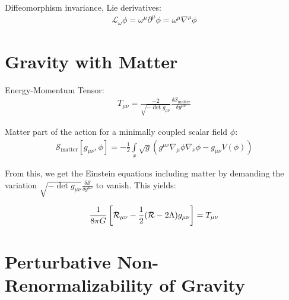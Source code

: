 Diffeomorphism invariance, Lie derivatives:
\begin{align}
	\mathcal{L}_{\omega}\phi = \omega^{\mu}\partial^{\mu}\phi = \omega^{\mu}\nabla^{\mu}\phi
\end{align}

\section{Gravity with Matter} 

Energy-Momentum Tensor:
\begin{align}
	T_{\mu\nu} = \frac{-2}{\sqrt{-\operatorname{det}g_{\mu\nu}}} \frac{\delta\mathcal{S}_{\text{matter}}}{\delta g^{\mu\nu}}
\end{align}

Matter part of the action for a minimally coupled scalar field $\phi$:
\begin{align}
	\mathcal{S}_{\text{matter}}[g_{\mu\nu}, \phi] = -\frac{1}{2} \int\limits_x \sqrt{g}\left( g^{\mu\nu}\nabla_{\mu}\phi\nabla_{\nu}\phi - g_{\mu\nu} V(\phi) \right)
\end{align}

From this, we get the Einstein equations including matter by demanding the variation $\sqrt{-\operatorname{det}g_{\mu\nu}}\frac{\delta\mathcal{S}}{\delta g^{\mu\nu}}$ to vanish. This yields:

\begin{align}
\frac{1}{8\pi G}\left[\mathcal{R}_{\mu\nu} - \frac{1}{2}(\mathcal{R} - 2\Lambda)g_{\mu\nu}\right] = T_{\mu\nu}	
\end{align}


\section{Perturbative Non-Renormalizability of Gravity}


